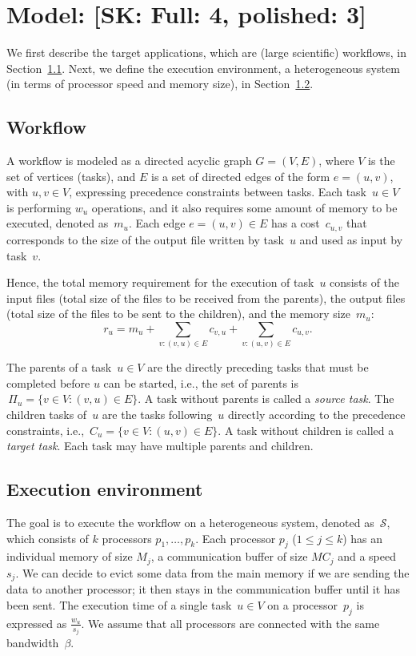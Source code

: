 \documentclass[conference]{IEEEtran}
\newcommand{\parents}[1]{\,\Pi_{#1}}
\newcommand{\children}[1]{\,C_{#1}}
\newcommand{\cluster}{\,\mathcal{S}}
\newcommand{\skug}[1]{{\color{blue}[SK: #1]}}
\begin{document}
    \section{Model: \skug{Full: 4, polished: 3}}

    We first describe the target applications, which are (large scientific) workflows,
    in Section~\ref{sec.mod.work}.  Next, we define the execution
    environment, a heterogeneous system (in terms of processor speed and memory size),
    in Section~\ref{sec.mod.plat}.

    \subsection{Workflow}
    \label{sec.mod.work}
    A workflow is modeled as a directed acyclic graph $G=(V, E)$, where $V$ is the set of vertices (tasks), and
    $E$ is a set of directed edges of the form $e=(u,v)$, with $u,v\in V$, expressing precedence constraints between tasks.
    Each task~$u \in V$  is performing $w_u$ operations, and it also
    requires some amount of memory to be executed, denoted as~$m_u$.
    Each edge $e=(u,v) \in E$ has a cost~$c_{u,v}$ that corresponds to the size of the output file written by task~$u$ and used as input by task~$v$.

    Hence, the total  memory requirement for the execution of task~$u$ consists of the input files
    (total size of the files to be received from the parents),
    the output files (total size of the files to be sent to the children),
    and the memory size~$m_u$:
    \[
        r_u = m_u + \sum_{v:(v,u)\in E}c_{v,u} + \sum_{v:(u,v)\in E} c_{u,v}.
    \]

    The parents of a task~$u\in V$ are the directly preceding tasks that must be completed before $u$ can be started, i.e., the set of parents is
    $ \parents{u} = \{v \in V: (v,u) \in E\}$. A task without parents is called a {\it source task}.
    The children tasks of~$u$ are the tasks following~$u$ directly according to the precedence constraints, i.e.,
    $ \children{u} = \{v \in V: (u,v) \in E\}$. A task without children is called a {\it target task}.
    Each task may have multiple parents and children.

    \subsection{Execution environment}
    \label{sec.mod.plat}

    The goal is to execute the workflow on a heterogeneous system, denoted as $\cluster$, which
    consists of $k$ processors $p_1, \dots, p_k$.
    Each processor $p_j$ ($1 \leq j \leq k$) has an individual memory of size $M_j$, a communication
    buffer of size $MC_j$ and a speed~$s_j$.
    We can decide to evict some data from the main memory if we are sending the data
    to another processor; it then stays in the communication buffer until it has been sent.
    The execution time of a single task~$u\in V$ on a processor~$p_j$ is expressed as $\frac{w_u}{s_j}$.
    We assume that all processors are connected with the same bandwidth~$\beta$.
\end{document}
